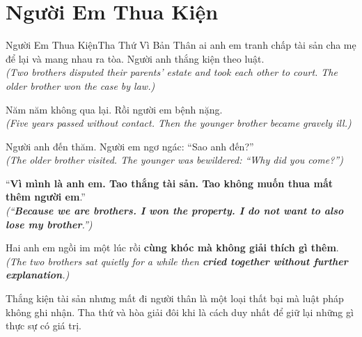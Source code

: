 \section{Người Em Thua Kiện}
\begin{truyen}{Người Em Thua Kiện}{Tha Thứ Vì Bản Thân}
ai anh em tranh chấp tài sản cha mẹ để lại và mang nhau ra tòa. Người anh thắng kiện theo luật.\\
\textit{(Two brothers disputed their parents' estate and took each other to court. The older brother won the case by law.)}

Năm năm không qua lại. Rồi người em bệnh nặng.\\
\textit{(Five years passed without contact. Then the younger brother became gravely ill.)}

Người anh đến thăm. Người em ngơ ngác: ``Sao anh đến?''\\
\textit{(The older brother visited. The younger was bewildered: ``Why did you come?'')}

``\textbf{Vì mình là anh em. Tao thắng tài sản. Tao không muốn thua mất thêm người em}.''\\
\textit{(``\textbf{Because we are brothers. I won the property. I do not want to also lose my brother}.'')}

Hai anh em ngồi im một lúc rồi \textbf{cùng khóc mà không giải thích gì thêm}.\\
\textit{(The two brothers sat quietly for a while then \textbf{cried together without further explanation}.)}
\end{truyen}
\begin{baihoc}
  Thắng kiện tài sản nhưng mất đi người thân là một loại thất bại mà luật pháp không ghi nhận. Tha thứ và hòa giải đôi khi là cách duy nhất để giữ lại những gì thực sự có giá trị.
\end{baihoc}

